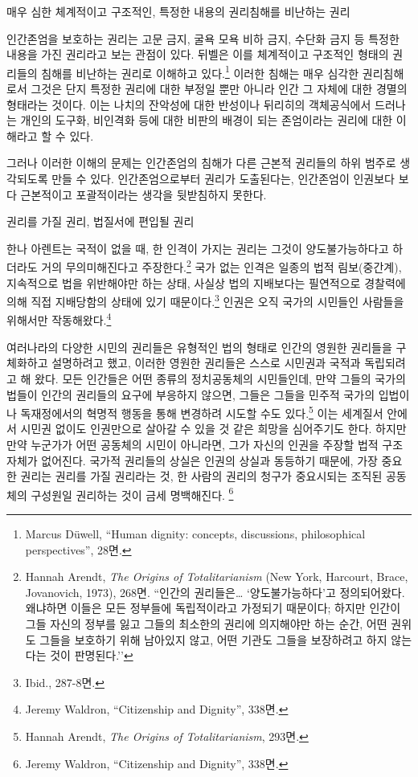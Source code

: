 매우 심한 체계적이고 구조적인, 특정한 내용의 권리침해를 비난하는 권리

인간존엄을 보호하는 권리는 고문 금지, 굴욕 모욕 비하 금지, 수단화 금지 등 특정한 내용을 가진 권리라고 보는 관점이 있다. 뒤벨은 이를 체계적이고 구조적인 형태의 권리들의 침해를 비난하는 권리로 이해하고 있다.\footnote{Marcus Düwell, ``Human dignity: concepts, discussions, philosophical perspectives'', 28면.} 이러한 침해는 매우 심각한 권리침해로서 그것은 단지 특정한 권리에 대한 부정일 뿐만 아니라 인간 그 자체에 대한 경멸의 형태라는 것이다. 이는 나치의 잔악성에 대한 반성이나 뒤리히의 객체공식에서 드러나는 개인의 도구화, 비인격화 등에 대한 비판의 배경이 되는 존엄이라는 권리에 대한 이해라고 할 수 있다.

그러나 이러한 이해의 문제는 인간존엄의 침해가 다른 근본적 권리들의 하위 범주로 생각되도록 만들 수 있다. 인간존엄으로부터 권리가 도출된다는, 인간존엄이 인권보다 보다 근본적이고 포괄적이라는 생각을 뒷받침하지 못한다.

권리를 가질 권리, 법질서에 편입될 권리

한나 아렌트는 국적이 없을 때, 한 인격이 가지는 권리는 그것이 양도불가능하다고 하더라도 거의 무의미해진다고 주장한다.\footnote{Hannah Arendt, \emph{The Origins of Totalitarianism} (New York, Harcourt, Brace, Jovanovich, 1973), 268면. ``인간의 권리들은\ldots{} `양도불가능하다'고 정의되어왔다. 왜냐하면 이들은 모든 정부들에 독립적이라고 가정되기 때문이다; 하지만 인간이 그들 자신의 정부를 잃고 그들의 최소한의 권리에 의지해야만 하는 순간, 어떤 권위도 그들을 보호하기 위해 남아있지 않고, 어떤 기관도 그들을 보장하려고 하지 않는다는 것이 판명된다.''} 국가 없는 인격은 일종의 법적 림보(중간계), 지속적으로 법을 위반해야만 하는 상태, 사실상 법의 지배보다는 필연적으로 경찰력에 의해 직접 지배당함의 상태에 있기 때문이다.\footnote{Ibid., 287-8면.} 인권은 오직 국가의 시민들인 사람들을 위해서만 작동해왔다.\footnote{Jeremy Waldron, ``Citizenship and Dignity'', 338면.}

여러나라의 다양한 시민의 권리들은 유형적인 법의 형태로 인간의 영원한 권리들을 구체화하고 설명하려고 했고, 이러한 영원한 권리들은 스스로 시민권과 국적과 독립되려고 해 왔다. 모든 인간들은 어떤 종류의 정치공동체의 시민들인데, 만약 그들의 국가의 법들이 인간의 권리들의 요구에 부응하지 않으면, 그들은 그들을 민주적 국가의 입법이나 독재정에서의 혁명적 행동을 통해 변경하려 시도할 수도 있다.\footnote{Hannah Arendt, \emph{The Origins of Totalitarianism}, 293면.} 이는 세계질서 안에서 시민권 없이도 인권만으로 살아갈 수 있을 것 같은 희망을 심어주기도 한다. 하지만 만약 누군가가 어떤 공동체의 시민이 아니라면, 그가 자신의 인권을 주장할 법적 구조 자체가 없어진다. 국가적 권리들의 상실은 인권의 상실과 동등하기 때문에, 가장 중요한 권리는 권리를 가질 권리라는 것, 한 사람의 권리의 청구가 중요시되는 조직된 공동체의 구성원일 권리하는 것이 금세 명백해진다. \footnote{Jeremy Waldron, ``Citizenship and Dignity'', 338면.}

